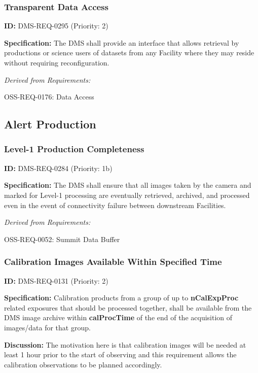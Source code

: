 \documentclass[SE,toc,lsstdraft]{lsstdoc}
\begin{document}
\subsubsection{Transparent Data Access}

\label{DMS-REQ-0295}
\textbf{ID:} DMS-REQ-0295 (Priority: 2)

\textbf{Specification:} The DMS shall provide an interface that allows retrieval by productions or science users of datasets from any Facility where they may reside without requiring reconfiguration.

\emph{Derived from Requirements:}

OSS-REQ-0176:
Data Access \newline

\subsection{Alert Production}

\subsubsection{Level-1 Production Completeness}

\label{DMS-REQ-0284}
\textbf{ID:} DMS-REQ-0284 (Priority: 1b)

\textbf{Specification:} The DMS shall ensure that all images taken by the camera and marked for Level-1 processing are eventually retrieved, archived, and processed even in the event of connectivity failure between downstream Facilities.

\emph{Derived from Requirements:}

OSS-REQ-0052:
Summit Data Buffer \newline

\subsubsection{Calibration Images Available Within Specified Time}

\label{DMS-REQ-0131}
\textbf{ID:} DMS-REQ-0131 (Priority: 2)

\textbf{Specification:} Calibration products from a group of up to \textbf{nCalExpProc} related exposures that should be processed together, shall be available from the DMS image archive within \textbf{calProcTime} of the end of the acquisition of images/data for that group.

\textbf{Discussion: }The motivation here is that calibration images will be needed at least 1 hour prior to the start of observing and this requirement allows the calibration observations to be planned accordingly.
\end{document}
